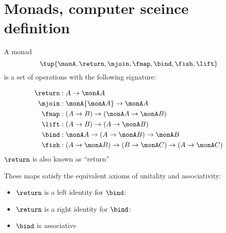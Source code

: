 \section{Monads, computer sceince definition}

\begin{definition}\label{def:monad-computer-science}
  A monad \begin{equation}
    \tup{ \monA,\return,\mjoin,\fmap,\bind,\fish,\lift} 
  \end{equation}
  is a set of operations with the following signature:
  
  \begin{align*}
  \return & :A\to\monA A\\
  \mjoin & :\monA{\monA A}\to\monA A\\
  \fmap & :(A\to B)\to(\monA A\to\monA B)\\
  \lift & :(A\to B)\to( A\to\monA B)\\
  \bind & :\monA A\to(A\to\monA B)\to\monA B\\
  \fish & :(A\to\monA B)\to(B\to\monA C)\to(A\to\monA C)
  \end{align*}
  $\return$ is also known as ``return''
  
  These maps satisfy the equivalent axioms of unitality and associativity:
  \begin{itemize}
  \item $\return$ is a left identity for $\bind$:
  
  \item $\return$ is a right identity for $\bind$:
  
  \item $\bind$ is associative
  
  \end{itemize}
\end{definition}